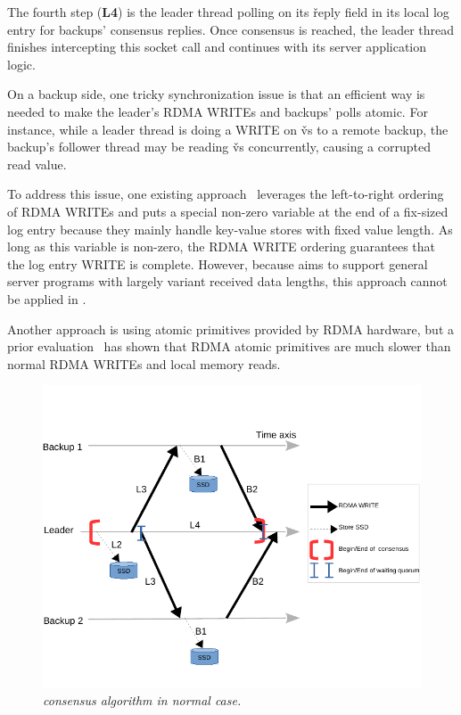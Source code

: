 The fourth step (\textbf{L4}) is the leader thread polling on its \v{reply} 
field in its local log entry for backups' consensus replies. Once consensus is 
reached, the leader thread finishes intercepting this \recv socket call and 
continues with its server application logic.

% 


On a backup side, one tricky synchronization issue is that an efficient way is 
needed to make the leader's RDMA WRITEs and backups' polls atomic. For instance, 
while a leader thread is doing a WRITE on \v{vs} to a remote backup, the
backup's follower thread may be reading \v{vs} concurrently, causing a 
corrupted read value.

To address this issue, one existing approach~\cite{farm:nsdi14,herd:sigcomm14} 
leverages the left-to-right ordering of RDMA WRITEs and puts a special 
non-zero variable at the end of a fix-sized log entry because they mainly 
handle key-value stores with fixed value length. As long as this variable is 
non-zero, the RDMA WRITE ordering guarantees that the log entry WRITE is 
complete. However, because \xxx aims to support general server programs with 
largely variant received data lengths, this approach cannot be applied in \xxx.

Another approach is using atomic primitives provided by RDMA hardware, 
but a prior evaluation~\cite{drtm:sosp15} has shown that RDMA atomic 
primitives are much slower than normal RDMA WRITEs and local memory reads.

\begin{figure}[t]
\centering
\vspace{-0.4in}
\includegraphics[width=.48\textwidth]{figures/consensus}
\vspace{-.25in}
\caption{{\em \xxx consensus algorithm in normal case.}} \label{fig:consensus}
\vspace{-.2in}
\end{figure}


